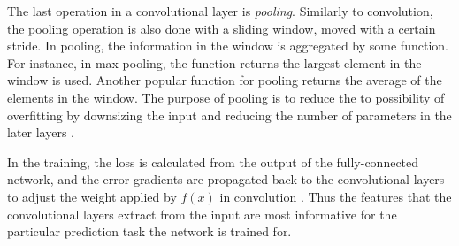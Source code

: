 The last operation in a convolutional layer is \emph{pooling}.
Similarly to convolution, the pooling operation is also done with a sliding window, moved with a certain stride.
In pooling, the information in the window is aggregated by some function.
For instance, in max-pooling, the function returns the largest element in the window is used.
Another popular function for pooling returns the average of the elements in the window.
The purpose of pooling is to reduce the to possibility of overfitting by downsizing the input and reducing the number of parameters in the later layers \citep{krizhevsky2012imagenet}.

In the training, the loss is calculated from the output of the fully-connected network, and the error gradients are propagated back to the convolutional layers to adjust the weight applied by $f(x)$ in convolution \citep{goldberg2016primer}.
Thus the features that the convolutional layers extract from the input are most informative for the particular prediction task the network is trained for.
